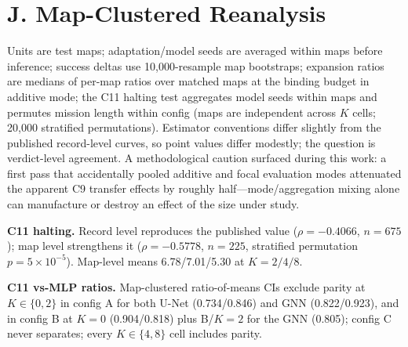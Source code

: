 \documentclass[letterpaper]{article} %
\newcommand{\stage}[1]{\textsc{#1}}
\begin{document}
\section{J. Map-Clustered Reanalysis}

Units are test maps; adaptation/model seeds are averaged within maps before inference; success deltas use 10{,}000-resample map bootstraps; expansion ratios are medians of per-map ratios over matched maps at the binding budget in additive mode; the \stage{C11} halting test aggregates model seeds within maps and permutes mission length within config (maps are independent across $K$ cells; 20{,}000 stratified permutations). Estimator conventions differ slightly from the published record-level curves, so point values differ modestly; the question is verdict-level agreement. A methodological caution surfaced during this work: a first pass that accidentally pooled additive and focal evaluation modes attenuated the apparent \stage{C9} transfer effects by roughly half---mode/aggregation mixing alone can manufacture or destroy an effect of the size under study.

\textbf{\stage{C11} halting.} Record level reproduces the published value ($\rho{=}-0.4066$, $n{=}675$); map level strengthens it ($\rho{=}-0.5778$, $n{=}225$, stratified permutation $p{=}5{\times}10^{-5}$). Map-level means 6.78/7.01/5.30 at $K{=}2/4/8$.

\textbf{\stage{C11} vs-MLP ratios.} Map-clustered ratio-of-means CIs exclude parity at $K\in\{0,2\}$ in config A for both U-Net (0.734/0.846) and GNN (0.822/0.923), and in config B at $K{=}0$ (0.904/0.818) plus B/$K{=}2$ for the GNN (0.805); config C never separates; every $K\in\{4,8\}$ cell includes parity.
\end{document}
